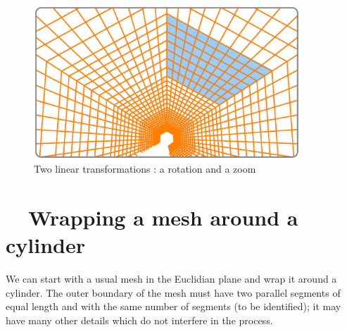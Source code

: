 \begin{figure}[ht] \centering
  \includegraphics[width=100mm]{sector-3.eps}
  \caption{Two linear transformations : a rotation and a zoom}
  \label{\numb section 7.\numb fig 9}
\end{figure}


\section{~~Wrapping a mesh around a cylinder}\label{\numb section 7.\numb parag 14}

We can start with a usual mesh in the Euclidian plane and wrap it around a cylinder.
The outer boundary of the mesh must have two parallel segments of equal length and with
the same number of segments (to be identified); it may have many other details
which do not interfere in the process.

